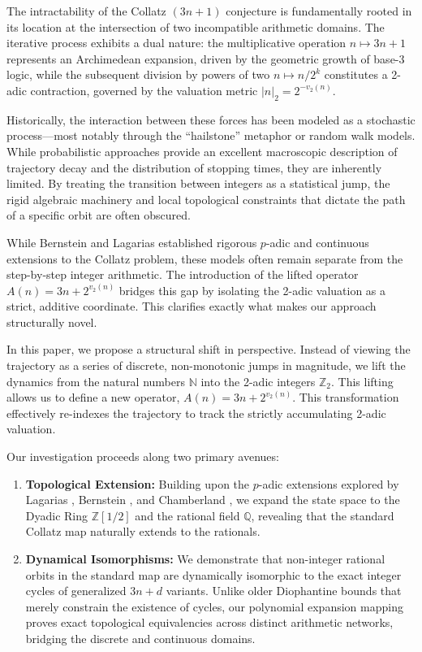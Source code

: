 \documentclass[11pt, a4paper]{article}
\theoremstyle{definition}
\begin{document}
The intractability of the Collatz $(3n+1)$ conjecture \cite{Lagarias1985, Lagarias2010} is fundamentally rooted in its location at the intersection of two incompatible arithmetic domains. The iterative process exhibits a dual nature: the multiplicative operation $n \mapsto 3n+1$ represents an Archimedean expansion, driven by the geometric growth of base-3 logic, while the subsequent division by powers of two $n \mapsto n/2^{k}$ constitutes a 2-adic contraction, governed by the valuation metric $|n|_{2}=2^{-v_{2}(n)}$. 

Historically, the interaction between these forces has been modeled as a stochastic process---most notably through the ``hailstone'' metaphor or random walk models. While probabilistic approaches provide an excellent macroscopic description of trajectory decay and the distribution of stopping times, they are inherently limited. By treating the transition between integers as a statistical jump, the rigid algebraic machinery and local topological constraints that dictate the path of a specific orbit are often obscured.

While Bernstein \cite{Bernstein1994} and Lagarias \cite{Lagarias1985} established rigorous $p$-adic and continuous extensions to the Collatz problem, these models often remain separate from the step-by-step integer arithmetic. The introduction of the lifted operator $A(n)=3n+2^{v_{2}(n)}$ bridges this gap by isolating the 2-adic valuation as a strict, additive coordinate. This clarifies exactly what makes our approach structurally novel.

In this paper, we propose a structural shift in perspective. Instead of viewing the trajectory as a series of discrete, non-monotonic jumps in magnitude, we lift the dynamics from the natural numbers $\mathbb{N}$ into the 2-adic integers $\mathbb{Z}_{2}$. This lifting allows us to define a new operator, $A(n) = 3n + 2^{v_2(n)}$. This transformation effectively re-indexes the trajectory to track the strictly accumulating 2-adic valuation.

Our investigation proceeds along two primary avenues:
\begin{enumerate}
    \item \textbf{Topological Extension:} Building upon the $p$-adic extensions explored by Lagarias \cite{Lagarias1985}, Bernstein \cite{Bernstein1994}, and Chamberland \cite{Chamberland1996}, we expand the state space to the Dyadic Ring $\mathbb{Z}[1/2]$ and the rational field $\mathbb{Q}$, revealing that the standard Collatz map naturally extends to the rationals.
    \item \textbf{Dynamical Isomorphisms:} We demonstrate that non-integer rational orbits in the standard map are dynamically isomorphic to the exact integer cycles of generalized $3n+d$ variants. Unlike older Diophantine bounds that merely constrain the existence of cycles, our polynomial expansion mapping proves exact topological equivalencies across distinct arithmetic networks, bridging the discrete and continuous domains.
\end{enumerate}
\end{document}
